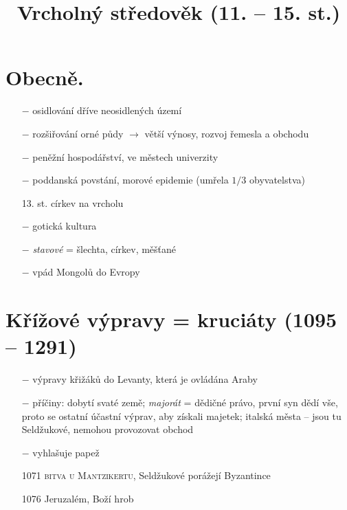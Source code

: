 \documentclass{article}
\title{\vspace{-2cm}Vrcholný středověk (11. -- 15. st.)\vspace{-1.7cm}}
\date{}
\author{}
\begin{document}
\maketitle

\section*{Obecně.}
\begin{itemize}
    \vspace{-0.5em}
    \setlength\itemsep{0.15em}
    \item[$-$] osidlování dříve neosidlených území
    \item[$-$] rozšiřování orné půdy $\rightarrow$ větší výnosy, rozvoj řemesla a obchodu
    \item[$-$] peněžní hospodářství,  ve městech univerzity
    \item[$-$] poddanská povstání, morové epidemie (umřela $1 / 3$ obyvatelstva)
    \item[13. st.] církev na vrcholu
    \item[$-$] gotická kultura
    \item[$-$] \textit{stavové} = šlechta, církev, měšťané
    \item[$-$] vpád Mongolů do Evropy
\end{itemize}


\section*{Křížové výpravy = kruciáty (1095 -- 1291)}
\begin{itemize}
    \vspace{-0.5em}
    \setlength\itemsep{0.15em}
    \item[$-$] výpravy křižáků do Levanty, která je ovládána Araby
    \item[$-$] příčiny: dobytí svaté země; \textit{majorát} = dědičné právo, první syn dědí vše, proto se ostatní účastní výprav, aby získali majetek; italská města -- jsou tu Seldžukové, nemohou provozovat obchod
    \item[$-$] vyhlašuje papež
    \item[1071] \textsc{bitva u Mantzikertu}, Seldžukové porážejí Byzantince
    \item[1076] Jeruzalém, Boží hrob
\end{itemize}
\end{document}
